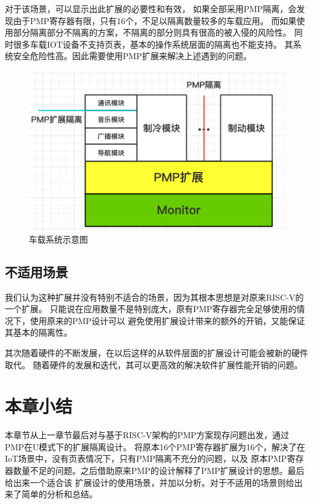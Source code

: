 对于该场景，可以显示出此扩展的必要性和有效，
如果全部采用PMP隔离，会发现由于PMP寄存器有限，只有16个，不足以隔离数量较多的车载应用。
而如果使用部分隔离部分不隔离的方案，不隔离的部分则具有很高的被入侵的风险性。
同时很多车载IOT设备不支持页表，基本的操作系统层面的隔离也不能支持。
其系统安全危险性高。因此需要使用PMP扩展来解决上述遇到的问题。
\begin{figure}
    \centering
    \includegraphics[scale=0.45]{Figures/extend/car.png}
    \decoRule
    \caption{车载系统示意图}
    \label{fig:car}
\end{figure}

\subsection{不适用场景}
我们认为这种扩展并没有特别不适合的场景，因为其根本思想是对原来RISC-V的一个扩展。
只能说在应用数量不是特别庞大，原有PMP寄存器完全足够使用的情况下，使用原来的PMP设计可以
避免使用扩展设计带来的额外的开销，又能保证其基本的隔离性。

其次随着硬件的不断发展，在以后这样的从软件层面的扩展设计可能会被新的硬件取代。
随着硬件的发展和迭代，其可以更高效的解决软件扩展性能开销的问题。

\section{本章小结}
本章节从上一章节最后对与基于RISC-V架构的PMP方案现存问题出发，通过PMP在U模式下的扩展隔离设计。
将原本16个PMP寄存器扩展为16个，解决了在IoT场景中，没有页表情况下，只有PMP隔离不充分的问题，以及
原本PMP寄存器数量不足的问题。之后借助原来PMP的设计解释了PMP扩展设计的思想。最后给出来一个适合该
扩展设计的使用场景，并加以分析。对于不适用的场景则给出来了简单的分析和总结。